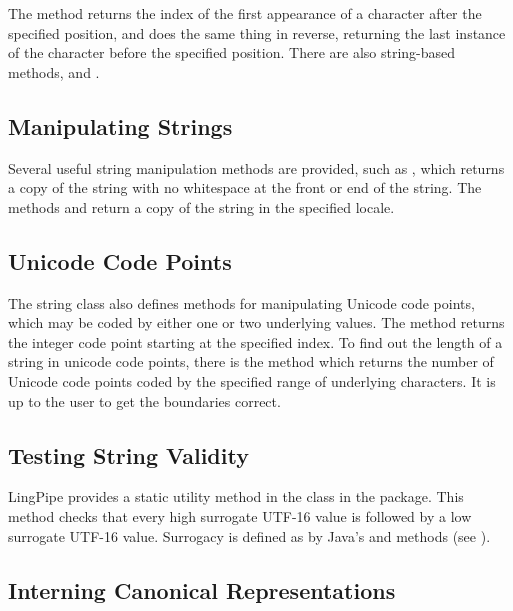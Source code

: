 The  method returns the index of the first
appearance of a character after the specified position, and
 does the same thing in reverse,
returning the last instance of the character before the specified
position.  There are also string-based methods,  and
.

\subsection{Manipulating Strings}

Several useful string manipulation methods are provided, such as
, which returns a copy of the string with no whitespace
at the front or end of the string.  The methods
 and  return a
copy of the string in the specified locale.

\subsection{Unicode Code Points}

The string class also defines methods for manipulating Unicode
code points, which may be coded by either one or two underlying
 values.  The method  returns
the integer code point starting at the specified index.  To find out
the length of a string in unicode code points, there is the method
 which returns the number of Unicode
code points coded by the specified range of underlying characters.  It
is up to the user to get the boundaries correct.

\subsection{Testing String Validity}

LingPipe provides a static utility method
 in the  class in
the  package.  This method checks that every
high surrogate UTF-16  value is followed by a low surrogate
UTF-16 value.  Surrogacy is defined as by Java's
 and
 methods (see ).


\subsection{Interning Canonical Representations}\label{section:string-intern}

